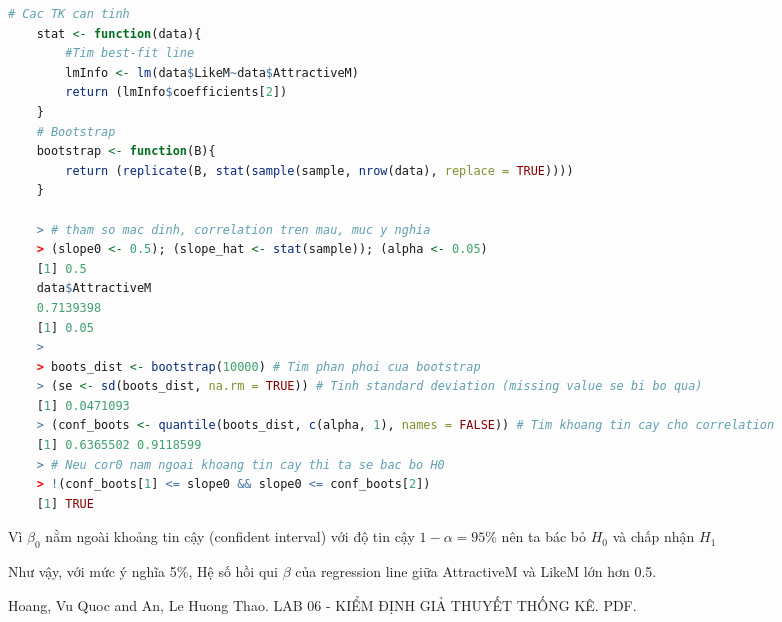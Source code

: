 \documentclass[a4paper,12pt]{article}
\begin{document}
	\begin{lstlisting}[language=R]
	# Cac TK can tinh
	stat <- function(data){
		#Tim best-fit line
		lmInfo <- lm(data$LikeM~data$AttractiveM)
		return (lmInfo$coefficients[2])
	}
	# Bootstrap
	bootstrap <- function(B){
		return (replicate(B, stat(sample(sample, nrow(data), replace = TRUE))))
	}
	
	> # tham so mac dinh, correlation tren mau, muc y nghia
	> (slope0 <- 0.5); (slope_hat <- stat(sample)); (alpha <- 0.05)
	[1] 0.5
	data$AttractiveM 
	0.7139398 
	[1] 0.05
	> 
	> boots_dist <- bootstrap(10000) # Tim phan phoi cua bootstrap
	> (se <- sd(boots_dist, na.rm = TRUE)) # Tinh standard deviation (missing value se bi bo qua)
	[1] 0.0471093
	> (conf_boots <- quantile(boots_dist, c(alpha, 1), names = FALSE)) # Tim khoang tin cay cho correlation
	[1] 0.6365502 0.9118599
	> # Neu cor0 nam ngoai khoang tin cay thi ta se bac bo H0
	> !(conf_boots[1] <= slope0 && slope0 <= conf_boots[2])
	[1] TRUE
	\end{lstlisting}
	
	Vì $\beta_0$ nằm ngoài khoảng tin cậy (confident interval) với độ tin cậy $1 - \alpha = 95\%$ nên ta bác bỏ $H_0$ và chấp nhận $H_1$
	
	Như vậy, với mức ý nghĩa 5\%, Hệ số hồi qui $\beta$ của regression line giữa AttractiveM và LikeM lớn hơn 0.5.
	 
	\begin{thebibliography}{00}
		 Hoang, Vu Quoc and An, Le Huong Thao. LAB 06 - KIỂM ĐỊNH GIẢ THUYẾT THỐNG KÊ. PDF.
	\end{thebibliography}
\end{document}
